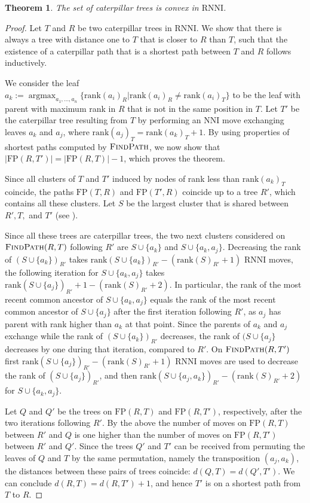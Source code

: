 \documentclass[11pt]{amsart}
\newtheorem{theorem}{Theorem}
\newcommand{\rnni}{\mathrm{RNNI}}
\newcommand{\findpath}{\textsc{FindPath}}
\newcommand{\rank}{\mathrm{rank}}
\newcommand{\nni}{\mathrm{NNI}}
\newcommand{\fp}{\mathrm{FP}}
\DeclareMathOperator*{\argmax}{argmax}
\begin{document}
\begin{theorem}
	The set of caterpillar trees is convex in $\rnni$.
	\label{thm:caterpillar_convex_rnni}
\end{theorem}

\begin{proof}
	Let $T$ and $R$ be two caterpillar trees in $\rnni$.
	We show that there is always a tree with distance one to $T$ that is closer to $R$ than $T$, such that the existence of a caterpillar path that is a shortest path between $T$ and $R$ follows inductively.

	We consider the leaf $a_k := \argmax_{a_1, \ldots, a_n}\{\rank(a_i)_R | \rank(a_i)_R \neq \rank(a_i)_T\}$ to be the leaf with parent with maximum rank in $R$ that is not in the same position in $T$.
	Let $T'$ be the caterpillar tree resulting from $T$ by performing an $\nni$ move exchanging leaves $a_k$ and $a_j$, where $\rank(a_j)_T = \rank(a_k)_T + 1$.
	By using properties of shortest paths computed by $\findpath$, we now show that $|\fp(R,T')| = |\fp(R,T)| - 1$, which proves the theorem.

	Since all clusters of $T$ and $T'$ induced by nodes of rank less than $\rank(a_k)_T$ coincide, the paths $\fp(T,R)$ and $\fp(T',R)$ coincide up to a tree $R'$, which contains all these clusters.
	Let $S$ be the largest cluster that is shared between $R', T,$ and $T'$ (see \autocite{fig:proof_caterpillar_convex_rnni}).

	Since all these trees are caterpillar trees, the two next clusters considered on $\findpath(R,T)$ following $R'$ are $S \cup \{a_k\}$ and $S \cup \{a_k, a_j\}$.
	Decreasing the rank of $(S \cup \{a_k\})_{R'}$ takes $\rank(S \cup \{a_k\})_{R'} - (\rank(S)_{R'} + 1)$ $\rnni$ moves, the following iteration for $S \cup \{a_k, a_j\}$ takes $\rank(S \cup \{a_j\})_{R'} + 1 - (\rank(S)_{R'} + 2)$.
	In particular, the rank of the most recent common ancestor of $S \cup \{a_k, a_j\}$ equals the rank of the most recent common ancestor of $S \cup \{a_j\}$ after the first iteration following $R'$, as $a_j$ has parent with rank higher than $a_k$ at that point.
	Since the parents of $a_k$ and $a_j$ exchange while the rank of $(S \cup \{a_k\})_{R'}$ decreases, the rank of $(S \cup \{a_j\}$ decreases by one during that iteration, compared to $R'$.
	On $\findpath(R,T')$ first $\rank(S \cup \{a_j\})_{R'} - (\rank(S)_{R'} + 1)$ $\rnni$ moves are used to decrease the rank of $(S \cup \{a_j\})_{R'}$, and then $\rank(S \cup \{a_j, a_k\})_{R'} - (\rank(S)_{R'} + 2)$ for $S \cup \{a_k, a_j\}$.

	Let $Q$ and $Q'$ be the trees on $\fp(R,T)$ and $\fp(R,T')$, respectively, after the two iterations following $R'$.
	By the above the number of moves on $\fp(R,T)$ between $R'$ and $Q$ is one higher than the number of moves on $\fp(R,T')$ between $R'$ and $Q'$.
	Since the trees $Q'$ and $T'$ can be received from permuting the leaves of $Q$ and $T$ by the same permutation, namely the transposition $(a_j, a_k)$, the distances between these pairs of trees coincide: $d(Q,T) = d(Q',T')$.
	We can conclude $d(R,T) = d(R,T') + 1$, and hence $T'$ is on a shortest path from $T$ to $R$.
\end{proof}
\end{document}
